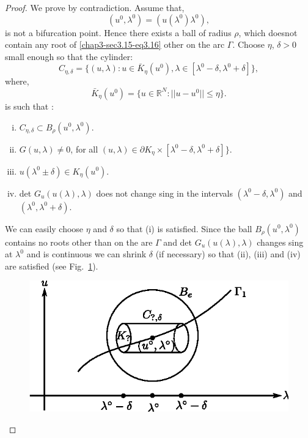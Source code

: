 \begin{proof}
We prove by contradiction. Assume that,
$$
(u^0, \lambda^0) = (u(\lambda^0 ) \lambda^0), 
$$
is not a bifurcation point. Hence there exists a ball of radius
$\rho$, which does\pageoriginale not contain any root of
\eqref{chap3-sec3.15-eq3.16} other on the arc 
$\Gamma$. Choose $\eta$, $\delta > 0$ small enough so that the cylinder:  
$$
C_{\eta , \delta} = \{ ( u, \lambda) : u 
\in \bar{K}_{\eta}(u^0), \lambda \in [\lambda^0 -
  \delta, \lambda^0 + \delta] \}, 
$$
where,  
$$
\bar{K}_{\eta}(u^0)= \{ u \in \mathbb{R}^N : || u - u^0 ||
\leq \eta \}. 
$$
is such that : 
\begin{enumerate}[(i)] 
\item $C_{\eta, \delta } \subset B_{\rho} (u^0 , \lambda^0)$.  

\item $G(u,\lambda) \neq 0$, for all $(u, \lambda) \in \partial 
  K_{\eta} \times [\lambda^0 - \delta, \lambda^0 + \delta] \}$. 

\item $u(\lambda^0 \pm \delta) \in K_{\eta}(u^0)$.

\item det $G_u(u(\lambda),\lambda)$ does not change sing in the
  intervals $(\lambda^0 - \delta,\lambda^0) $ and
  $(\lambda^0,\lambda^0 + \delta)$. 
\end{enumerate}

We can easily choose $\eta$ and $\delta$ so that (i) is
satisfied. Since the ball $B_{\rho}(u^0, \lambda^0)$ contains no roots
other than on the are $\Gamma$ and det $G_u (u(\lambda), \lambda)$
changes sing at $\lambda^0$ and is continuous we can shrink $\delta$
(if necessary) so that (ii), (iii) and (iv) are satisfied (see
Fig.~\ref{chap3-fig3.3}).
 
\begin{figure}[H]
\centering
\includegraphics{vol79-fig/fig79-21.eps}
\smallskip
\caption{}
\label{chap3-fig3.3}
\end{figure}



\end{proof}
